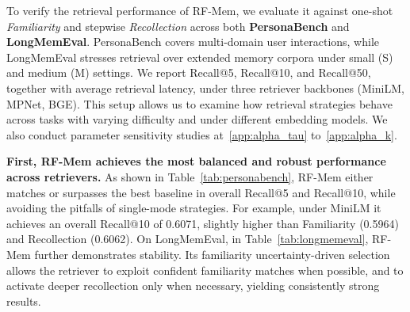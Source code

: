 
To verify the retrieval performance of RF-Mem, we evaluate it against one-shot \emph{Familiarity} and stepwise \emph{Recollection} across both \textbf{PersonaBench} and \textbf{LongMemEval}. PersonaBench covers multi-domain user interactions, while LongMemEval stresses retrieval over extended memory corpora under small (S) and medium (M) settings. We report Recall@5, Recall@10, and Recall@50, together with average retrieval latency, under three retriever backbones (MiniLM, MPNet, BGE). This setup allows us to examine how retrieval strategies behave across tasks with varying difficulty and under different embedding models. We also conduct parameter sensitivity studies at~\ref{app:alpha_tau} to~\ref{app:alpha_k}.

\textbf{First, RF-Mem achieves the most balanced and robust performance across retrievers.} 
As shown in Table~\ref{tab:personabench}, RF-Mem either matches or surpasses the best baseline in overall Recall@5 and Recall@10, while avoiding the pitfalls of single-mode strategies. For example, under MiniLM it achieves an overall Recall@10 of 0.6071, slightly higher than Familiarity (0.5964) and Recollection (0.6062). On LongMemEval, in Table~\ref{tab:longmemeval}, RF-Mem further demonstrates stability. Its familiarity uncertainty-driven selection allows the retriever to exploit confident familiarity matches when possible, and to activate deeper recollection only when necessary, yielding consistently strong results.

